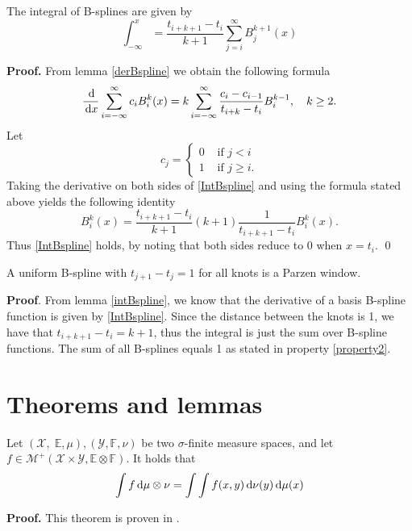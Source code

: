 \begin{lemma}\label{intBspline}
The integral of B-splines are given by
\begin{equation}
\int_{-\infty}^x = \frac{t_{i+k+1}-t_i}{k+1} \sum_{j=i}^\infty B_j^{k+1}(x)
\end{equation}
\end{lemma}
\textbf{Proof.} From lemma \ref{derBspline} we obtain the following formula
\begin{equation}
  \frac{\df}{\df x} \sum_{i=-\infty}^\infty c_i B_i^k(x) = k\sum_{i=-\infty}^\infty \frac{c_i-c_{i-1}}{t_{i+k}-t_i}B_i^{k-1}, \quad k\geq 2.\label{IntBspline}
\end{equation}
Let 
\[
  c_j = \begin{cases}0 & \mbox{ if } j<i\\ 1 & \mbox{ if } j\geq i.\end{cases}
\]
Taking the derivative on both sides of \eqref{IntBspline} and using the formula stated above yields the following identity
\begin{equation}
B_i^k(x) = \frac{t_{i+k+1}-t_{i}}{k+1}(k+1)\frac{1}{t_{i+k+1}-t_{i}}B_i^k(x).
\end{equation}
Thus \eqref{IntBspline} holds, by noting that both sides reduce to 0 when $x = t_i$. \hfill\qed\\

\begin{proposition}\label{PWBspline}
A uniform B-spline with $t_{j+1}-t_j = 1$ for all knots is a Parzen window.
\end{proposition}
\textbf{Proof}. From lemma \ref{intBspline}, we know that the derivative of a basis B-spline function is given by \eqref{IntBspline}. Since the distance between the knots is 1, we have that $t_{i+k+1}-t_i = k+1$, thus the integral is just the sum over B-spline functions. The sum of all B-splines equals 1 as stated in property \ref{property2}.\\

\section{Theorems and lemmas}

\begin{theorem}\label{Tonelli}
Let $(\mathcal{X},\;\mathbb{E},\mu),(\mathcal{Y},\mathbb{F},\nu)$ be two $\sigma$-finite measure spaces, and let $f\in\mathcal{M}^+(\mathcal{X}\times \mathcal{Y},\mathbb{E}\otimes\mathbb{F})$. It holds that
\begin{equation}
\int f \,{\rm d}\mu\otimes\nu = \int\int f(x,y) \,{\rm d} \nu(y) \,{\rm d} \mu(x)
\end{equation}
\end{theorem}
\textbf{Proof.} This theorem is proven in \cite[p.~195]{hansen.09}.\\

